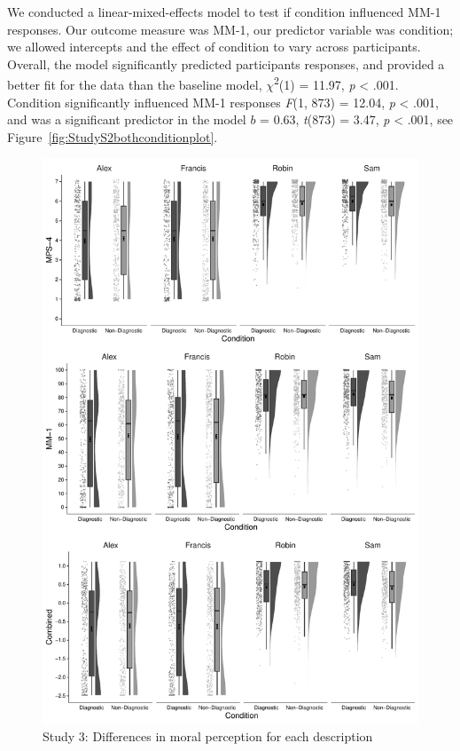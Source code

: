 \documentclass[
  man,floatsintext]{apa6}
\begin{document}
We conducted a linear-mixed-effects model to test if condition influenced MM-1 responses. Our outcome measure was MM-1, our predictor variable was condition; we allowed intercepts and the effect of condition to vary across participants. Overall, the model significantly predicted participants responses, and provided a better fit for the data than the baseline model, \(\chi\)\textsuperscript{2}(1) = 11.97, \emph{p} \textless{} .001. Condition significantly influenced MM-1 responses \emph{F}(1, 873) = 12.04, \emph{p} \textless{} .001, and was a significant predictor in the model \(b\) = 0.63, \emph{t}(873) = 3.47, \emph{p} \textless{} .001, see Figure~\ref{fig:StudyS2bothconditionplot}.

\begin{figure}[!p]
\includegraphics{Supplementary_files/figure-latex/StudyS2AllscenariosPlot-1} \caption{Study 3: Differences in moral perception for each description}\label{fig:StudyS2AllscenariosPlot}
\end{figure}
\end{document}
